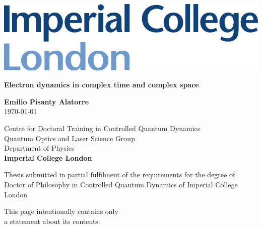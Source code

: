 
\begin{titlepage}

\includegraphics[scale=0.5]{0-Miscellaneous/Images/ImperialLogo.pdf}

\vspace{2cm}

\begin{center}
\textbf{{\Huge Electron dynamics in complex time and complex space}}\\


\vspace{5cm}


{\bf{\Large Emilio Pisanty Alatorre}} \\[7mm]
{\today}

\vspace{15mm}

Centre for Doctoral Training in Controlled Quantum Dynamics\\[2mm]
Quantum Optics and Laser Science Group\\[2mm]
Department of Physics\\[4mm]

\textbf{Imperial College London}


\vspace{1.5cm}

\begin{minipage}[center]{12cm}
\centering
Thesis submitted in partial fulfilment of the requirements for the degree of Doctor of Philosophy in Controlled Quantum Dynamics of Imperial College London
\end{minipage}


\end{center}

\end{titlepage}

\addtocounter{page}{0}  %

\mbox{}
\vspace{\fill}
\begin{center}
\scriptsize
This page intentionally contains only \\
a statement about its contents. 
\end{center}
\vspace{20mm}

\thispagestyle{empty}

\newpage